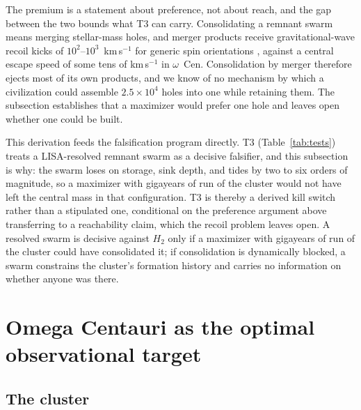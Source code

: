 \documentclass[11pt]{article}
\begin{document}
The premium is a statement about preference, not about reach, and the gap between the two bounds what T3 can carry. Consolidating a remnant swarm means merging stellar-mass holes, and merger products receive gravitational-wave recoil kicks of $10^{2}$--$10^{3}$~km\,s$^{-1}$ for generic spin orientations \citep{Campanelli2007,Lousto2011}, against a central escape speed of some tens of km\,s$^{-1}$ in $\omega$~Cen. Consolidation by merger therefore ejects most of its own products, and we know of no mechanism by which a civilization could assemble $2.5\times10^{4}$ holes into one while retaining them. The subsection establishes that a maximizer would prefer one hole and leaves open whether one could be built.

This derivation feeds the falsification program directly. T3 (Table~\ref{tab:tests}) treats a LISA-resolved remnant swarm as a decisive falsifier, and this subsection is why: the swarm loses on storage, sink depth, and tides by two to six orders of magnitude, so a maximizer with gigayears of run of the cluster would not have left the central mass in that configuration. T3 is thereby a derived kill switch rather than a stipulated one, conditional on the preference argument above transferring to a reachability claim, which the recoil problem leaves open. A resolved swarm is decisive against $H_2$ only if a maximizer with gigayears of run of the cluster could have consolidated it; if consolidation is dynamically blocked, a swarm constrains the cluster's formation history and carries no information on whether anyone was there.

\section{Omega Centauri as the optimal observational target}
\label{sec:omegacen}

\subsection{The cluster}
\end{document}
